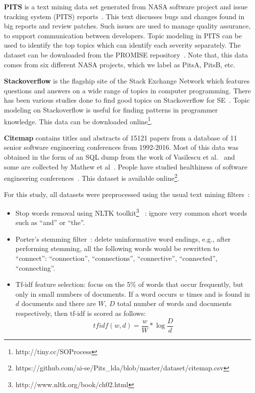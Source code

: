 \documentclass[twocolumn,5p,sort&compress]{elsarticle}
\newcommand{\bi}{\begin{itemize}}
\newcommand{\ei}{\end{itemize}}
\theoremstyle{break}
\begin{document}
\textbf{PITS} is a text mining data set generated from NASA software project
and issue tracking system (PITS) reports~\cite{menzies2008improving, menzies2008automated}. This text discusses
bugs and changes found in big reports and  review patches.
Such issues are used
to manage quality assurance, to support communication
between developers. Topic modeling in PITS can be used
to identify the top topics which can
identify each severity separately. The dataset can be downloaded from the
PROMISE
repository~\cite{promiserepo}. Note that, this data comes from six different
NASA projects, which we label as PitsA, PitsB, etc.
    
 \textbf{Stackoverflow} is the flagship site of the Stack Exchange Network which
 features questions and answers on a wide range of topics in computer
 programming. There has been various studies done to find good topics on Stackoverflow for SE~\cite{barua2014developers,linares2013exploratory, allamanis2013and,rosen2016mobile}.
Topic modeling on Stackoverflow is useful for finding patterns in programmer knowledge.
 This data can be downloaded online\footnote{http://tiny.cc/SOProcess}. 
    
  \textbf{Citemap} contains titles and abstracts of 15121 papers from a
 database of 11 senior software engineering conferences from 1992-2016. Most of this data was
 obtained in the form of an SQL dump from the work of Vasilescu et
 al.~\cite{vasilescu2013historical} and some are collected by Mathew et al~\cite{mathew2016trends}. People have studied healthiness of software engineering conferences~\cite{vasilescu2014healthy}. This dataset is available online\footnote{https://github.com/ai-se/Pits\_lda/blob/master/dataset/citemap.csv}.

  For this study, all  datasets were preprocessed using the usual text mining filters~\cite{feldman2006j}:
\bi
\item
  Stop words removal using NLTK toolkit\footnote{http://www.nltk.org/book/ch02.html}~\cite{bird2006nltk} : ignore very common short words such as  ``and'' or ``the''.
\item
  Porter's stemming filter~\cite{Porter1980}: delete uninformative word endings, e.g., after performing stemming, all the following words would be rewritten
  to ``connect'': ``connection'', ``connections'',
``connective'',          
``connected'',
  ``connecting''.
\item
  Tf-idf feature selection: focus on the 5\% of words that occur frequently,
  but only in small numbers of documents. If a word occurs $w$ times
  and is found in $d$ documents  and there
  are $W,\ D$ total number of words and documents respectively, then tf-idf is scored
  as follows:
  \[
  \mathit{tfidf}(w,d)=   \frac{w}{W} *\log{\frac{D}{d}}\]
  \ei
\end{document}
